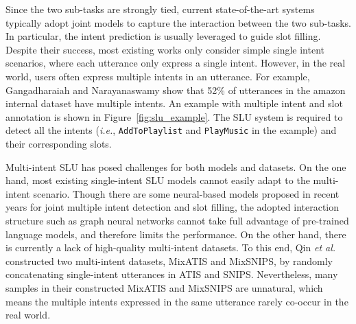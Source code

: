 \documentclass[11pt]{article}
\begin{document}
Since the two sub-tasks are strongly tied, current state-of-the-art systems typically adopt joint models to capture the interaction between the two sub-tasks\cite{DBLP:conf/ijcai/ZhangW16a,DBLP:conf/naacl/GooGHHCHC18,DBLP:conf/emnlp/LiLQ18,DBLP:conf/emnlp/QinCLWL19,Gunel2021SupervisedCL,tian2024opportunities,hersh2024search,tian2024opportunities,hersh2024search,zhu2024iapt,zhu-tan-2023-spt,Liu2022FewShotPF,xie2024pedro,Cui2023UltraFeedbackBL,zheng2024nat4at,zhu2023acf,gao2023f,zuo-etal-2022-continually,zhang-etal-2022-pcee,sun-etal-2022-simple,zhu-etal-2021-gaml,Zhu2021MVPBERTMP,li-etal-2019-pingan,zhu2019panlp,zhu2019dr,zhou2019analysis,zhang2025time,wang2025ts,liu2025parameter,yi2024drum,tian2024fanlora}. In particular, the intent prediction is usually leveraged to guide slot filling\cite{DBLP:conf/emnlp/QinXCL20}. Despite their success, most existing works only consider simple single intent scenarios, where each utterance only express a single intent. However, in the real world, users often express multiple intents in an utterance. For example, Gangadharaiah and Narayanaswamy\cite{DBLP:conf/naacl/GangadharaiahN19} show that 52\% of utterances in the amazon internal dataset have multiple intents. An example with multiple intent and slot annotation is shown in Figure~\ref{fig:slu_example}. The SLU system is required to detect all the intents (\emph{i.e.}, \texttt{AddToPlaylist} and \texttt{PlayMusic} in the example) and their corresponding slots.

Multi-intent SLU has posed challenges for both models and datasets. On the one hand, most existing single-intent SLU models cannot easily adapt to the multi-intent scenario. Though there are some neural-based models\cite{DBLP:conf/emnlp/QinXCL20,DBLP:conf/acl/QinWXXCL20,DBLP:journals/access/KumarB21} proposed in recent years for joint multiple intent detection and slot filling, the adopted interaction structure such as graph neural networks cannot take full advantage of pre-trained language models, and therefore limits the performance. On the other hand, there is currently a lack of high-quality multi-intent datasets. To this end, Qin \emph{et al.}\cite{DBLP:conf/emnlp/QinXCL20} constructed two multi-intent datasets, MixATIS and MixSNIPS, by randomly concatenating single-intent utterances in ATIS\cite{DBLP:conf/naacl/HemphillGD90} and SNIPS\cite{Coucke2018SNIPS}. Nevertheless, many samples in their constructed MixATIS and MixSNIPS are unnatural, which means the multiple intents expressed in the same utterance rarely co-occur in the real world.
\end{document}
